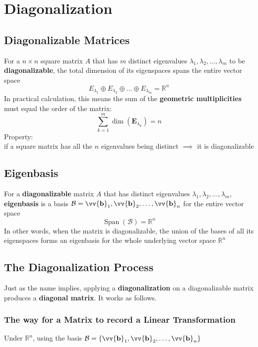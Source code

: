 \documentclass[11pt]{article}
\DeclareRobustCommand{\myvec}[1]{\vv{\mathbf{#1}}}
\newcommand{\mysubvecsp}[1]{\bm{{#1}}}
\newcommand{\myset}[1]{\mathcal{#1}}
\newcommand{\mymat}[1]{#1}
\begin{document}
    \section{Diagonalization}
    \subsection{Diagonalizable Matrices}
    For a $n \times n$ square matrix $\mymat{A}$ that has $m$ distinct eigenvalues $\lambda_1, \lambda_2, \dots, \lambda_m$ to be \textbf{diagonalizable}, the total dimension of its eigenspaces spans the entire vector space
    \begin{equation}
        \mymat{E}_{\lambda_1} \oplus \mymat{E}_{\lambda_2} \oplus \dots \oplus \mymat{E}_{\lambda_m} = \mathbb{R}^n
    \end{equation}
    In practical calculation, this means the sum of the \textbf{geometric multiplicities} must equal the order of the matrix:
    \begin{equation}
        \sum_{k=1}^{m} \dim(\mysubvecsp{E}_{\lambda_k}) = n
    \end{equation}
    Property: \\
    if a square matrix has all the $n$ eigenvalues being distinct $\implies$ it is diagonalizable

    \subsection{Eigenbasis}
    For a \textbf{diagonalizable} matrix $\mymat{A}$ that has distinct eigenvalues $\lambda_1, \lambda_2, \dots, \lambda_m$, \\
    \textbf{eigenbasis} is a basis $\myset{B} = \myvec{b}_1, \myvec{b}_2, \dots, \myvec{b}_n$ for the entire vector space
    \[ \operatorname{Span}(\myset{B}) = \mathbb{R}^n \]
    In other words, when the matrix is diagonalizable, the union of the bases of all its eigenspaces forms 
    an eigenbasis for the whole underlying vector space $\mathbb{R}^n$
    
    \subsection{The Diagonalization Process}
    Just as the name implies, applying a \textbf{diagonalization} on a diagonalizable matrix produces a \textbf{diagonal matrix}.
    It works as follows.
    
    \subsubsection{The way for a Matrix to record a Linear Transformation}
    Under $\mathbb{R}^n$, using the basis $\myset{B} = \{ \myvec{b}_1, \myvec{b}_2, \dots, \myvec{b}_n \}$ \vspace{1ex}
\end{document}
